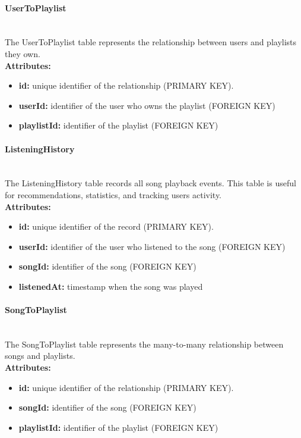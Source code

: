 \documentclass[11pt, a4paper]{article}
\begin{document}
\paragraph{UserToPlaylist}~\\
The UserToPlaylist table represents the relationship between users and playlists they own.
~\\\textbf{Attributes:}
\begin{itemize}
    \item \textbf{id:} unique identifier of the relationship (PRIMARY KEY).
    \item \textbf{userId:} identifier of the user who owns the playlist (FOREIGN KEY)
    \item \textbf{playlistId:} identifier of the playlist (FOREIGN KEY)
\end{itemize}

\paragraph{ListeningHistory}~\\
The ListeningHistory table records all song playback events. This table is useful for recommendations, statistics, and tracking users activity.
~\\\textbf{Attributes:}
\begin{itemize}
    \item \textbf{id:} unique identifier of the record (PRIMARY KEY).
    \item \textbf{userId:} identifier of the user who listened to the song (FOREIGN KEY)
    \item \textbf{songId:} identifier of the song (FOREIGN KEY)
    \item \textbf{listenedAt:} timestamp when the song was played
\end{itemize}

\paragraph{SongToPlaylist}~\\
The SongToPlaylist table represents the many-to-many relationship between songs and playlists.
~\\\textbf{Attributes:}
\begin{itemize}
    \item \textbf{id:} unique identifier of the relationship (PRIMARY KEY).
    \item \textbf{songId:} identifier of the song (FOREIGN KEY)
    \item \textbf{playlistId:} identifier of the playlist (FOREIGN KEY)
\end{itemize}
\end{document}
